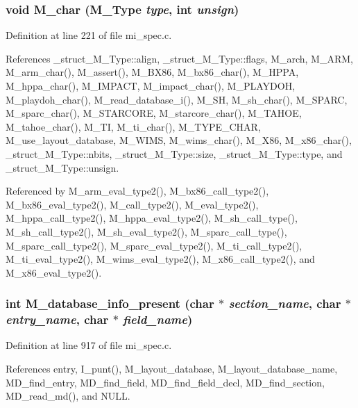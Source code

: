 \subsubsection{\setlength{\rightskip}{0pt plus 5cm}void M\_\-char (\bf{M\_\-Type} {\em type}, int {\em unsign})}\label{mi__spec_8c_dc827d44a11aa7ff63e4e879617c39fe}




Definition at line 221 of file mi\_\-spec.c.

References \_\-struct\_\-M\_\-Type::align, \_\-struct\_\-M\_\-Type::flags, M\_\-arch, M\_\-ARM, M\_\-arm\_\-char(), M\_\-assert(), M\_\-BX86, M\_\-bx86\_\-char(), M\_\-HPPA, M\_\-hppa\_\-char(), M\_\-IMPACT, M\_\-impact\_\-char(), M\_\-PLAYDOH, M\_\-playdoh\_\-char(), M\_\-read\_\-database\_\-i(), M\_\-SH, M\_\-sh\_\-char(), M\_\-SPARC, M\_\-sparc\_\-char(), M\_\-STARCORE, M\_\-starcore\_\-char(), M\_\-TAHOE, M\_\-tahoe\_\-char(), M\_\-TI, M\_\-ti\_\-char(), M\_\-TYPE\_\-CHAR, M\_\-use\_\-layout\_\-database, M\_\-WIMS, M\_\-wims\_\-char(), M\_\-X86, M\_\-x86\_\-char(), \_\-struct\_\-M\_\-Type::nbits, \_\-struct\_\-M\_\-Type::size, \_\-struct\_\-M\_\-Type::type, and \_\-struct\_\-M\_\-Type::unsign.

Referenced by M\_\-arm\_\-eval\_\-type2(), M\_\-bx86\_\-call\_\-type2(), M\_\-bx86\_\-eval\_\-type2(), M\_\-call\_\-type2(), M\_\-eval\_\-type2(), M\_\-hppa\_\-call\_\-type2(), M\_\-hppa\_\-eval\_\-type2(), M\_\-sh\_\-call\_\-type(), M\_\-sh\_\-call\_\-type2(), M\_\-sh\_\-eval\_\-type2(), M\_\-sparc\_\-call\_\-type(), M\_\-sparc\_\-call\_\-type2(), M\_\-sparc\_\-eval\_\-type2(), M\_\-ti\_\-call\_\-type2(), M\_\-ti\_\-eval\_\-type2(), M\_\-wims\_\-eval\_\-type2(), M\_\-x86\_\-call\_\-type2(), and M\_\-x86\_\-eval\_\-type2().
\subsubsection{\setlength{\rightskip}{0pt plus 5cm}int M\_\-database\_\-info\_\-present (char $\ast$ {\em section\_\-name}, char $\ast$ {\em entry\_\-name}, char $\ast$ {\em field\_\-name})}\label{mi__spec_8c_3aef7fd2d4a98ba53736eda03b55a7a1}




Definition at line 917 of file mi\_\-spec.c.

References entry, I\_\-punt(), M\_\-layout\_\-database, M\_\-layout\_\-database\_\-name, MD\_\-find\_\-entry, MD\_\-find\_\-field, MD\_\-find\_\-field\_\-decl, MD\_\-find\_\-section, MD\_\-read\_\-md(), and NULL.
